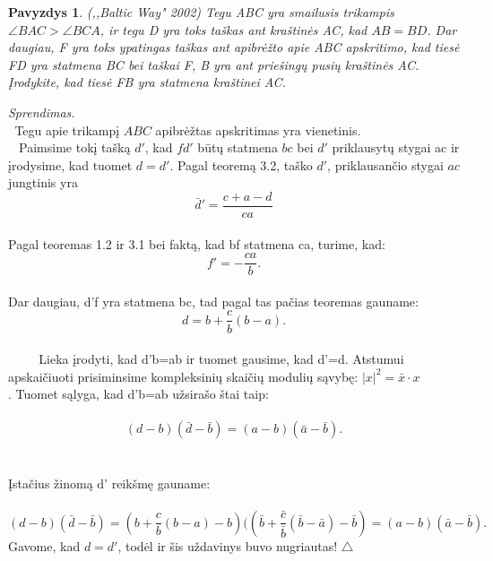 \documentclass[11pt,a4paper,twoside]{book}
\newenvironment{sprendimas}{\noindent \textit{Sprendimas.}}{\hfill $\triangle$}
\newcounter{foo}[subsection]
\newtheorem{pavnr}[foo]{Pavyzdys}
\theoremstyle{definition} \newtheorem*{api}{Apibrėžimas}
\theoremstyle{remark} \newtheorem*{pastaba}{Pastaba}
\begin{document}
\begin{pavnr}
(,,Baltic Way" 2002) Tegu ABC yra smailusis trikampis $ \angle BAC > \angle BCA$,
ir tegu D yra toks taškas ant kraštinės AC, kad $AB = BD$. Dar daugiau, F
yra toks ypatingas taškas ant apibrėžto apie ABC apskritimo, kad
tiesė FD yra statmena BC bei taškai
F, B yra ant priešingų pusių kraštinės AC. Įrodykite, kad tiesė FB yra statmena
kraštinei AC.
\end{pavnr}
\begin{sprendimas}
\\   $\phantom{a}$Tegu apie trikampį $ABC$ apibrėžtas apskritimas yra vienetinis. 
\\   $\phantom{a}$ Paimsime tokį tašką $d'$, kad $fd'$ būtų statmena $bc$ bei $d'$ priklausytų
 stygai ac ir įrodysime, kad tuomet $d=d'$. 
Pagal teoremą 3.2, taško $d'$, priklausančio stygai $ac$ jungtinis yra
\\ $$\bar d' = \frac {c+a-d}{ca}$$
\\Pagal teoremas
1.2 ir 3.1 bei faktą, kad bf statmena ca, turime, kad:
\\ $$ f'= - \frac {ca}{b}.$$
\\ Dar daugiau, d'f yra statmena bc, tad pagal tas pačias teoremas gauname:
$$ d= b+ \frac {c}{b}(b-a).$$
\\ $\phantom{aaaa}$ Lieka įrodyti, kad d'b=ab ir tuomet gausime, kad 
d'=d. Atstumui apskaičiuoti prisiminsime kompleksinių skaičių modulių sąvybę:
$ |x|^2=\bar x \cdot x$\\. Tuomet sąlyga, kad d'b=ab užsirašo štai taip:
\\
\\  $$ (d-b)( \bar d - \bar b)=(a-b)( \bar a - \bar b).$$
\\
\\ Įstačius žinomą d' reikšmę gauname:
\\
\\ $$ (d-b)( \bar d - \bar b)=( b+ \frac {c}{b}(b-a)-b)(( \bar b+ \frac {\bar c}{\bar b}(\bar b-\bar a)-\bar b)=(a-b)( \bar a - \bar b).$$
Gavome, kad $d=d'$, todėl ir šis uždavinys buvo nugriautas!
\end{sprendimas}
\end{document}
